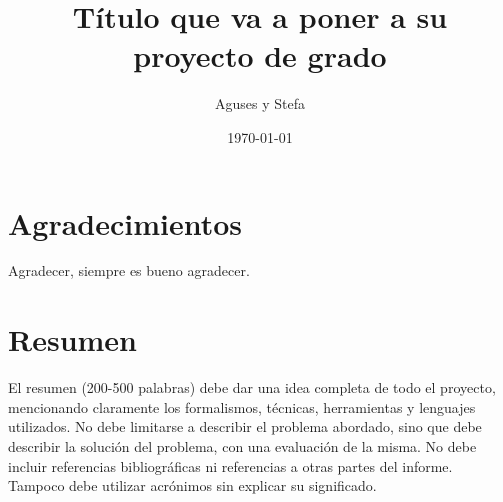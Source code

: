 \documentclass{prgrado}
\title{Título que va a poner a su proyecto de grado}
\author{Aguses y Stefa}
\date{\today}
\begin{document}

\frontmatter %

\maketitle



\chapter*{Agradecimientos}

Agradecer, siempre es bueno agradecer.




\chapter*{Resumen}

El resumen (200-500 palabras) debe dar una idea completa de todo el
proyecto, mencionando claramente los formalismos, técnicas, herramientas y lenguajes
utilizados. No debe limitarse a describir el problema abordado, sino que debe describir
la solución del problema, con una evaluación de la misma. No debe incluir referencias
bibliográficas ni referencias a otras partes del informe. Tampoco debe utilizar
acrónimos sin explicar su significado.


\hfill \break
{}


\tableofcontents
\newpage



\mainmatter %
\end{document}
